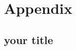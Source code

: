 \newpage
\appendix
\renewcommand{\thesection}{\Alph{section}}
\renewcommand{\appendixname}{Appendix}
\renewcommand{\thesubsection}{\thesection.\arabic{subsection}}
\renewcommand\thefigure{\thesection.\arabic{figure}}
\renewcommand\thetable{\thesection.\arabic{table}}
\setcounter{table}{0}
\setcounter{figure}{0}
\section{Appendix}
\subsection{your title}

\newpage
